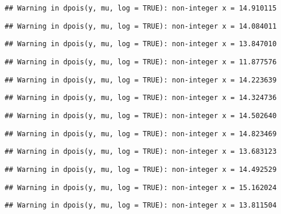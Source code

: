 \documentclass[
]{article}
\begin{document}
\begin{verbatim}
## Warning in dpois(y, mu, log = TRUE): non-integer x = 14.910115
\end{verbatim}

\begin{verbatim}
## Warning in dpois(y, mu, log = TRUE): non-integer x = 14.084011
\end{verbatim}

\begin{verbatim}
## Warning in dpois(y, mu, log = TRUE): non-integer x = 13.847010
\end{verbatim}

\begin{verbatim}
## Warning in dpois(y, mu, log = TRUE): non-integer x = 11.877576
\end{verbatim}

\begin{verbatim}
## Warning in dpois(y, mu, log = TRUE): non-integer x = 14.223639
\end{verbatim}

\begin{verbatim}
## Warning in dpois(y, mu, log = TRUE): non-integer x = 14.324736
\end{verbatim}

\begin{verbatim}
## Warning in dpois(y, mu, log = TRUE): non-integer x = 14.502640
\end{verbatim}

\begin{verbatim}
## Warning in dpois(y, mu, log = TRUE): non-integer x = 14.823469
\end{verbatim}

\begin{verbatim}
## Warning in dpois(y, mu, log = TRUE): non-integer x = 13.683123
\end{verbatim}

\begin{verbatim}
## Warning in dpois(y, mu, log = TRUE): non-integer x = 14.492529
\end{verbatim}

\begin{verbatim}
## Warning in dpois(y, mu, log = TRUE): non-integer x = 15.162024
\end{verbatim}

\begin{verbatim}
## Warning in dpois(y, mu, log = TRUE): non-integer x = 13.811504
\end{verbatim}
\end{document}
